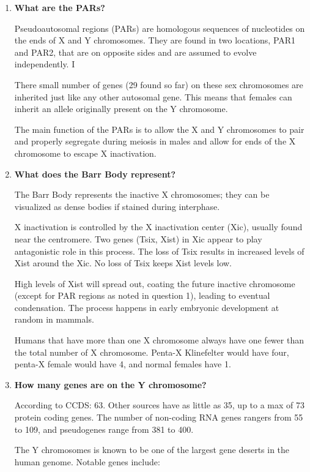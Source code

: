 \documentclass[basic]{inVerba-notes}
\begin{document}
  \begin{enumerate}
    \item \textbf{What are the PARs?}
    
    Pseudoautosomal regions (PARs) are homologous sequences of nucleotides on the ends of X and Y chromosomes. They are found in two locations, PAR1 and PAR2, that are on opposite sides and are assumed to evolve independently. I

    There small number of genes (29 found so far) on these sex chromosomes are inherited just like any other autosomal gene. This means that females can inherit an allele originally present on the Y chromosome. 

    The main function of the PARs is to allow the X and Y chromosomes to pair and properly segregate during meiosis in males and allow for ends of the X chromosome to escape X inactivation. 

    \item \textbf{What does the Barr Body represent?}

    The Barr Body represents the inactive X chromosomes; they can be visualized as dense bodies if stained during interphase.

    X inactivation is controlled by the X inactivation center (Xic), usually found near the centromere. Two genes (Tsix, Xist) in Xic appear to play antagonistic role in this process. The loss of Tsix results in increased levels of Xist around the Xic. No loss of Tsix keeps Xist levels low. 

    High levels of Xist will spread out, coating the future inactive chromosome (except for PAR regions as noted in question 1), leading to eventual condensation. The process happens in early embryonic development at random in mammals. 

    Humans that have more than one X chromosome always have one fewer than the total number of X chromosome. Penta-X Klinefelter would have four, penta-X female would have 4, and normal females have 1.

    \item \textbf{How many genes are on the Y chromosome?}
    
    According to CCDS\@: 63. Other sources have as little as 35, up to a max of 73 protein coding genes. The number of non-coding RNA genes rangers from 55 to 109, and pseudogenes range from 381 to 400.

    The Y chromosomes is known to be one of the largest gene deserts in the human genome. Notable genes include: 


\end{enumerate}
\end{document}
